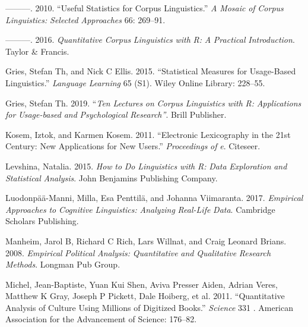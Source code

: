 \hypertarget{bookmarkid1v1yuxt}{}———. 2010. “Useful Statistics for Corpus Linguistics.” \textit{A} \textit{Mosaic} \textit{of} \textit{Corpus} \textit{Linguistics:} \textit{Selected} \textit{Approaches} 66: 269–91.

\hypertarget{bookmarkid4f1mdlm}{}———. 2016. \textit{Quantitative} \textit{Corpus} \textit{Linguistics} \textit{with} \textit{R:} \textit{A} \textit{Practical} \textit{Introduction}. Taylor \& Francis.

\hypertarget{bookmarkid2u6wntf}{}Gries, Stefan Th, and Nick C Ellis. 2015. “Statistical Measures for Usage-Based Linguistics.” \textit{Language} \textit{Learning} 65 (S1). Wiley Online Library: 228–55.

Gries, Stefan Th. 2019. “\textit{Ten} \textit{Lectures} \textit{on} \textit{Corpus} \textit{Linguistics} \textit{with} \textit{R:} \textit{Applications} \textit{for} \textit{Usage-based} \textit{and} \textit{Psychological} \textit{Research”}. Brill Publisher.

\hypertarget{bookmarkid19c6y18}{}Kosem, Iztok, and Karmen Kosem. 2011. “Electronic Lexicography in the 21st Century: New Applications for New Users.” \textit{Proceedings} \textit{of} \textit{e\citealt{Lex2011}}. Citeseer.

\hypertarget{bookmarkid3tbugp1}{}Levshina, Natalia. 2015. \textit{How} \textit{to} \textit{Do} \textit{Linguistics} \textit{with} \textit{R:} \textit{Data} \textit{Exploration} \textit{and} \textit{Statistical} \textit{Analysis}. John Benjamins Publishing Company.

\hypertarget{bookmarkid28h4qwu}{}Luodonpää-Manni, Milla, Esa Penttilä, and Johanna Viimaranta. 2017. \textit{Empirical} \textit{Approaches} \textit{to} \textit{Cognitive} \textit{Linguistics:} \textit{Analyzing} \textit{Real-Life} \textit{Data}. Cambridge Scholars Publishing.

\hypertarget{bookmarkidnmf14n}{}Manheim, Jarol B, Richard C Rich, Lars Willnat, and Craig Leonard Brians. 2008. \textit{Empirical} \textit{Political} \textit{Analysis:} \textit{Quantitative} \textit{and} \textit{Qualitative} \textit{Research} \textit{Methods}. Longman Pub Group.

\hypertarget{bookmarkid37m2jsg}{}Michel, Jean-Baptiste, Yuan Kui Shen, Aviva Presser Aiden, Adrian Veres, Matthew K Gray, Joseph P Pickett, Dale Hoiberg, et al. 2011. “Quantitative Analysis of Culture Using Millions of Digitized Books.” \textit{Science} 331 . American Association for the Advancement of Science: 176–82.

